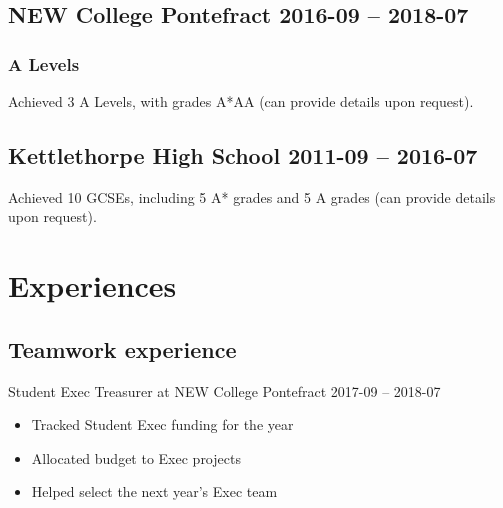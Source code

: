 \documentclass[10pt]{extarticle}
\begin{document}
    \subsection{NEW College Pontefract
        \hfill 2016-09 -- 2018-07}
        \subsubsection{A Levels}
            Achieved 3 A Levels, with grades A*AA (can provide details upon request).
            \begin{comment}
                \begin{tabular}{cccc}
                    \textbf{Subject} & \textbf{Exam Board} & \textbf{AS/A2} &
                    \textbf{Grade}\\
                    Mathematics & AQA & A2 & A* \\
                    Further Mathematics & AQA & A2 & A \\
                    Computer Science & OCR & A2 & A \\
                    Physics & AQA & AS & A
                \end{tabular}
            \end{comment}
    \subsection{Kettlethorpe High School
        \hfill 2011-09 -- 2016-07}
        Achieved 10 GCSEs, including 5 A* grades and 5 A grades (can provide details
        upon request).
\section{Experiences}
    \subsection{Teamwork experience}
        Student Exec Treasurer at NEW College Pontefract
        \hfill 2017-09 -- 2018-07\par
        \begin{itemize}
            \item Tracked Student Exec funding for the year
            \item Allocated budget to Exec projects
            \item Helped select the next year's Exec team
        \end{itemize}
\end{document}
